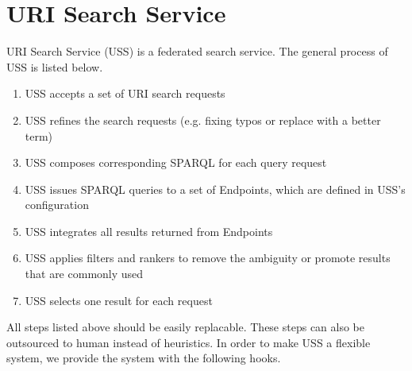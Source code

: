 \documentclass[letterpaper,10pt,english]{sphinxmanual}
\begin{document}
\section{URI Search Service}
\label{docs/uss:uss}\label{docs/uss::doc}\label{docs/uss:uri-search-service}
URI Search Service (USS) is a federated search service. The general process of USS is listed below.
\begin{enumerate}
\item {} 
USS accepts a set of URI search requests

\item {} 
USS refines the search requests (e.g. fixing typos or replace with a better term)

\item {} 
USS composes corresponding SPARQL for each query request

\item {} 
USS issues SPARQL queries to a set of Endpoints, which are defined in USS's configuration

\item {} 
USS integrates all results returned from Endpoints

\item {} 
USS applies filters and rankers to remove the ambiguity or promote results that are commonly used

\item {} 
USS selects one result for each request

\end{enumerate}

All steps listed above should be easily replacable. These steps can also be outsourced to human instead of heuristics. In order to make USS a flexible system, we provide the system with the following hooks.
\end{document}
